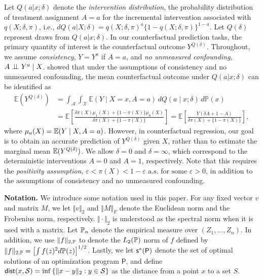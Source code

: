Let $Q(a | x;\delta)$ denote the \emph{intervention distribution}, the probability distribution of treatment assignment $A=a$ for the incremental intervention associated with $q(X; \delta, \pi)$, i.e., $dQ(a | X;\delta)=q(X; \delta, \pi)^a\{1-q(X; \delta, \pi)\}^{1-a}$. Let $Q(\delta)$ represent draws from $Q(a | x;\delta)$. In our counterfactual prediction tasks, the primary quantity of interest is the counterfactual outcome $Y^{Q(\delta)}$. Throughout, we assume \emph{consistency}, $Y=Y^a$ if $A=a$, and \emph{no unmeasured confounding}, $A \perp\!\!\!\perp Y^a \mid X$. \citet{kennedy2019nonparametric} showed that under the assumptions of consistency and no unmeasured confounding, the mean counterfactual outcome under $Q(a | x;\delta)$ can be identified as
\begin{align}
\mathbb{E}(Y^{Q(\delta)}) &= \int_{\mathcal{A}} \int_{\mathcal{X}} \mathbb{E}(Y \mid X = x, A = a) \, dQ(a \mid x;\delta) \, d\mathbb{P}(x) \nonumber \\
& = \mathbb{E} \left[ \frac{\delta \pi(X) \mu_1(X) + \{1 - \pi(X)\} \mu_0(X)}{\delta \pi(X) + \{1 - \pi(X)\}} \right] = \mathbb{E} \left[ \frac{Y(\delta A + 1 - A)}{\delta \pi(X) + \{1 - \pi(X)\}}\right] \label{eqn:mean-inc-outcome-identification},
\end{align}
where $\mu_a(X)=\mathbb{E}(Y \mid X,A=a)$. However, in counterfactual regression, our goal is to obtain an accurate prediction of $Y^{Q(\delta)}$ given $X$, rather than to estimate the marginal mean $\mathbb{E}(Y^{Q(\delta)})$. We allow $\delta = 0$ and $\delta = \infty$, which correspond to the deterministic interventions $A = 0$ and $A = 1$, respectively. Note that this requires the \emph{positivity assumption}, $\varepsilon < \pi(X) < 1-\varepsilon \text{ a.s. for some } \varepsilon >0$, in addition to the assumptions of consistency and no unmeasured confounding.

\textbf{Notation.}
We introduce some notation used in this paper. For any fixed vector $v$ and matrix $M$, we let $\Vert v \Vert_2$ and $\Vert M \Vert_F$ denote the Euclidean norm and the Frobenius norm, respectively. $\Vert \cdot \Vert_2$ is understood as the spectral norm when it is used with a matrix. Let $\mathbb{P}_n$ denote the empirical measure over $(Z_1,...,Z_n)$. In addition, we use $\Vert f \Vert_{2,\mathbb{P}}$ to denote the $L_2(\mathbb{P})$ norm of $f$ defined by $\Vert f \Vert_{2,\mathbb{P}} = \left[\int f(z)^2 d\mathbb{P}(z)\right]^{1/2}$. Lastly, we let $\mathsf{s}^*(\mathsf{P})$ denote the set of optimal solutions of an optimization program $\mathsf{P}$, and define $\textsf{dist}(x, \mathcal{S}) = \inf\left\{ \Vert x - y\Vert_2: y \in \mathcal{S} \right\}$ as the distance from a point $x$ to a set $S$.


